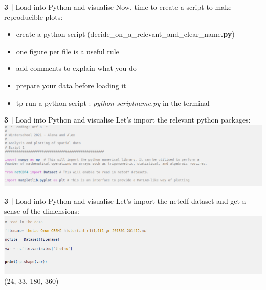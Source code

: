 
\begin{frame}{\textbf{3 |} Load into Python and visualise} 
    Now, time to create a script to make reproducible plots:
        \vspace{0.3cm}
    \begin{itemize}
        \item create a python script (decide\_on\_a\_relevant\_and\_clear\_name\textbf{.py})
             \vspace{0.3cm}
         \item one figure per file is a useful rule
             \vspace{0.3cm}
        \item add comments to explain what you do
             \vspace{0.3cm}
        \item prepare your data before loading it
             \vspace{0.3cm}
        \item tp run a python script : \textit{python scriptname.py} in the terminal
            \vspace{0.3cm}
    \end{itemize}
\end{frame}
 
 
 \begin{frame}{\textbf{3 |} Load into Python and visualise} 
    Let's import the relevant python packages:\\
        \vspace{0.3cm}
    \includegraphics[scale=0.35]{images/Script1_step1.png}
\end{frame}
 
 
\begin{frame}{\textbf{3 |} Load into Python and visualise} 
    Let's import the netcdf dataset and get a sense of the dimensions:\\
        \vspace{0.5cm}
    \includegraphics[scale=0.35]{images/Script1_step2.png}
        \vspace{2cm}
    (24, 33, 180, 360)
\end{frame}
 
